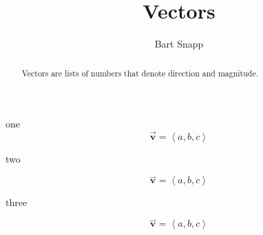 \documentclass{ximera}
\author{Bart Snapp}
\title[Dig-In:]{Vectors}
\begin{document}
\begin{abstract}
  Vectors are lists of numbers that denote direction and magnitude.
\end{abstract}
\maketitle




one
\[ \mathbf{\vec{v}} = \left\langle a,b,c \right\rangle   \]





two

\[ \overset{\rightharpoonup}{\mathbf{v}} = \left\langle a,b,c \right\rangle   \]





three

\[ \overset{\boldsymbol{\rightharpoonup}}{\mathbf{v}} = \left\langle a,b,c \right\rangle   \]
\end{document}
